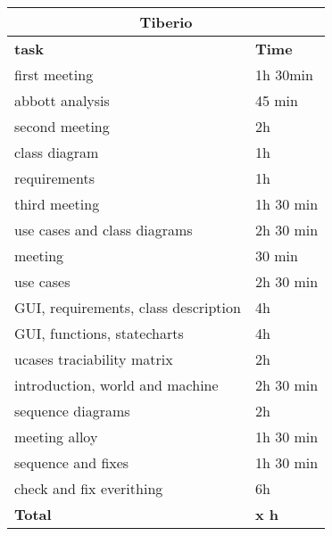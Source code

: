 \begin{table}[H]
\begin{tabular}{|l|l|}
\hline
\multicolumn{2}{|c|}{\textbf{Tiberio}}            \\ \hline
\textbf{task}                   & \textbf{Time} \\ \hline
first meeting                        & 1h 30min     \\ \hline
abbott analysis                      & 45 min    \\ \hline
second meeting                       & 2h        \\ \hline
class diagram                        & 1h        \\ \hline
requirements                         & 1h        \\ \hline
third meeting                        & 1h 30 min \\ \hline
use cases and class diagrams         & 2h 30 min \\ \hline
meeting                              & 30 min    \\ \hline
use cases                            & 2h 30 min \\ \hline
GUI, requirements, class description & 4h        \\ \hline
GUI, functions, statecharts          & 4h        \\ \hline
ucases traciability matrix           & 2h        \\ \hline
introduction, world and machine      & 2h 30 min \\ \hline
sequence diagrams                    & 2h        \\ \hline
meeting alloy                        & 1h 30 min \\ \hline
sequence and fixes                   & 1h 30 min \\ \hline
check and fix everithing             & 6h        \\ \hline
\rowcolor {polilight}
\textbf{Total}                  & \textbf{x h}   \\ \hline
\end{tabular}
\end{table}


